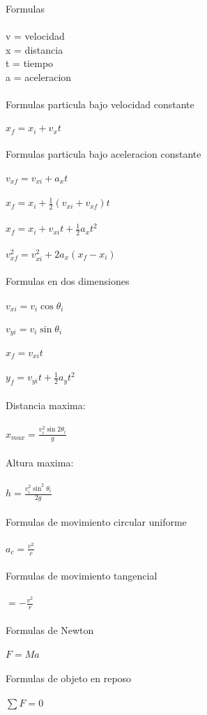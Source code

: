 \documentclass{article}
\begin{document}
    \large
    Formulas \\ \\
    v = velocidad \\
    x = distancia \\
    t = tiempo \\
    a = aceleracion \\ \\
    Formulas particula bajo velocidad constante \\ \\
    $x_f = x_i + v_x t$ \\ \\
    Formulas particula bajo aceleracion constante \\ \\
    $v_{xf} = v_{xi} + a_x t$ \\ \\
    $x_f = x_i + \frac{1}{2} (v_{xi} + v_{xf})t$ \\ \\
    $x_f = x_i + v_{xi}t + \frac{1}{2} a_xt^{2}$ \\ \\
    $v_{xf}^2 = v_{xi}^2+2a_x(x_f-x_i)$ \\ \\
    Formulas en dos dimensiones \\ \\
    $v_{xi} = v_i\cos \theta _i$ \\ \\
    $v_{yi} = v_i\sin \theta _i$ \\ \\
    $x_f = v_{xi}t$ \\ \\
    $y_f = v_{yi}t + \frac{1}{2}a_y t^2$ \\ \\
    Distancia maxima: \\ \\ 
    $x_{max} = \frac{v_i^2\sin 2\theta _i}{g}$ \\ \\
    Altura maxima: \\ \\
    $h = \frac{v_i ^2 \sin ^2\theta _i}{2g}$ \\ \\
    Formulas de movimiento circular uniforme \\ \\
    $a_c = \frac{v^2}{r}$ \\ \\
    Formulas de movimiento tangencial \\ \\
    $= -\frac{v^2}{r}$ \\ \\
    Formulas de Newton \\ \\
    $F = M  a$ \\ \\
    Formulas de objeto en reposo \\ \\
    $\sum F = 0$
\end{document}
